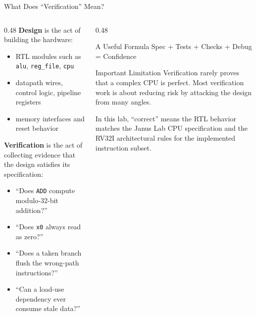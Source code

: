 \documentclass[aspectratio=169,10pt]{beamer}
\begin{document}
\begin{frame}{What Does ``Verification'' Mean?}
  \begin{columns}[T]
    \begin{column}{0.48\textwidth}
      \textbf{Design} is the act of building the hardware:
      \begin{itemize}
        \item RTL modules such as \texttt{alu}, \texttt{reg\_file}, \texttt{cpu}
        \item datapath wires, control logic, pipeline registers
        \item memory interfaces and reset behavior
      \end{itemize}

      \vspace{0.8em}
      \textbf{Verification} is the act of collecting evidence that the design satisfies its specification:
      \begin{itemize}
        \item ``Does \texttt{ADD} compute modulo-32-bit addition?''
        \item ``Does \texttt{x0} always read as zero?''
        \item ``Does a taken branch flush the wrong-path instructions?''
        \item ``Can a load-use dependency ever consume stale data?''
      \end{itemize}
    \end{column}
    \begin{column}{0.48\textwidth}
      \begin{block}{A Useful Formula}
        \centering
        \Large
        Spec + Tests + Checks + Debug = Confidence
      \end{block}

      \vspace{0.8em}
      \begin{alertblock}{Important Limitation}
        Verification rarely proves that a complex CPU is perfect. Most verification work is about reducing risk by attacking the design from many angles.
      \end{alertblock}

      \vspace{0.8em}
      \small
      In this lab, ``correct'' means the RTL behavior matches the Janus Lab CPU specification and the RV32I architectural rules for the implemented instruction subset.
    \end{column}
  \end{columns}
\end{frame}
\end{document}

